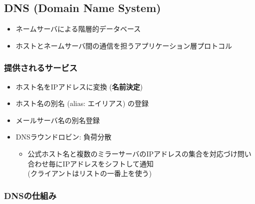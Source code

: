 \subsection{DNS (Domain Name System)}

\begin{itemize}
  \item ネームサーバによる階層的データベース
  \item ホストとネームサーバ間の通信を担うアプリケーション層プロトコル
\end{itemize}

\subsubsection{提供されるサービス}

\begin{itemize}
  \item ホスト名をIPアドレスに変換 (\textbf{名前決定})
  \item ホスト名の別名 (alias: エイリアス) の登録
  \item メールサーバ名の別名登録
\end{itemize}

\begin{itemize}
  \item DNSラウンドロビン: 負荷分散
  \begin{itemize}
    \item 公式ホスト名と複数のミラーサーバのIPアドレスの集合を対応づけ問い合わせ毎にIPアドレスをシフトして通知\\
      (クライアントはリストの一番上を使う)
  \end{itemize}
\end{itemize}

\subsubsection{DNSの仕組み}

